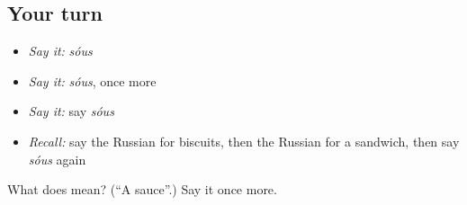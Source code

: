 \subsection*{Your turn}
\begin{itemize}
\raggedright
  \item \emph{Say it:} \emph{sóus}
  \item \emph{Say it:} \emph{sóus}, once more
  \item \emph{Say it:} say \emph{sóus}
  \item \emph{Recall:} say the Russian for biscuits, then the Russian for a sandwich, then say \emph{sóus} again
\end{itemize}

\begin{tcolorbox}[breakable,colback=teal!4,colframe=teal!35!black,title={Before you move on}]
What does  mean? (\textquotedblleft{}A sauce\textquotedblright{}.) Say it once more.
\end{tcolorbox}
